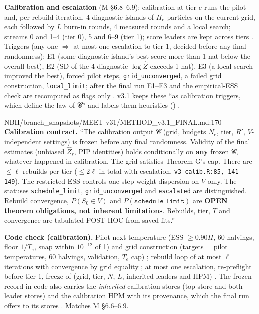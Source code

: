 \textbf{Calibration and escalation} (M \S6.8--6.9): calibration at tier $e$ runs the pilot and, per rebuild iteration, 4
diagnostic islands of $H_e$ particles on the current grid, each followed by $L$ burn-in rounds, 4 measured rounds and a local
search; streams 0 and 1--4 (tier 0), 5 and 6--9 (tier 1); score leaders are kept across tiers
. Triggers (any one $\Rightarrow$ at most one escalation to tier 1, decided before
any final randomness): E1 (some diagnostic island's best score more than 1 nat below the overall best), E2 (SD of the 4
diagnostic $\log\hat Z$ exceeds 1 nat), E3 (a local search improved the best), forced pilot steps, \texttt{grid\_unconverged},
a failed grid construction, \texttt{local\_limit}; after the final run E1--E3 and the empirical-ESS check are recomputed as
flags only . v3.1 keeps these ``as calibration triggers, which define the law of
𝓒'' and labels them heuristics () .

\begin{stmt}{NBH/branch_snapshots/MEET-v31/METHOD_v3.1_FINAL.md:170}
\textbf{Calibration contract.} ``The calibration output 𝓒 (grid, budgets $N_e$, tier, $R'$, $V$-independent settings) is frozen
before any final randomness. Validity of the final estimates (unbiased $\hat Z_r$, PIP identities) holds conditionally on
\textbf{any} frozen 𝓒, whatever happened in calibration. The grid satisfies Theorem G's cap. There are $\le\ell$ rebuilds per tier
($\le2\ell$ in total with escalation, \texttt{v3\_calib.R:85, 141--149}). The restricted ESS controls one-step weight dispersion on
$V$ only. The statuses \texttt{schedule\_limit}, \texttt{grid\_unconverged} and \texttt{escalated} are distinguished. Rebuild
convergence, $P(S_0\in V)$ and $P(\texttt{schedule\_limit})$ are \textbf{OPEN theorem obligations, not inherent limitations}.
Rebuilds, tier, $T$ and convergence are tabulated POST HOC from saved fits.''
\end{stmt}

\textbf{Code check (calibration).} Pilot next temperature (ESS $\ge0.90H$, 60 halvings, floor $1/T_e$, snap within
$10^{-12}$ of 1) and grid construction (targets = pilot temperatures, 60 halvings, validation, $T_e$ cap)
; rebuild loop of at most $\ell$
iterations with convergence by grid equality ;
at most one escalation, re-preflight before tier 1, freeze of (grid, tier, $N$, $L$, inherited leaders and HPM)
. The frozen record in code also
carries the \emph{inherited} calibration stores (top store and both leader stores) and the calibration HPM with its
provenance, which the final run offers to its stores 
. Matches M \S6.6--6.9.

